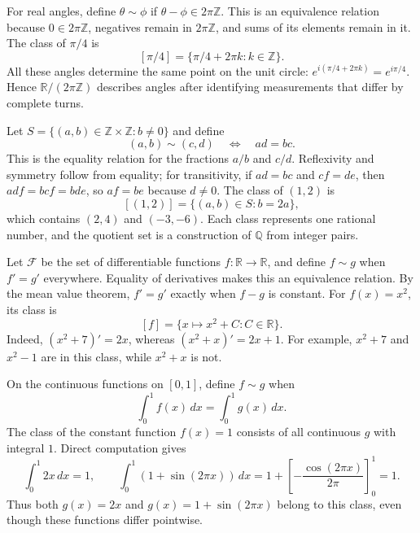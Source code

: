 \begin{example}
For real angles, define $\theta\sim\phi$ if $\theta-\phi\in2\pi\mathbb{Z}$. This is an equivalence relation because $0\in2\pi\mathbb{Z}$, negatives remain in $2\pi\mathbb{Z}$, and sums of its elements remain in it. The class of $\pi/4$ is
\[
  [\pi/4]=\{\pi/4+2\pi k:k\in\mathbb{Z}\}.
\]
All these angles determine the same point on the unit circle: $e^{i(\pi/4+2\pi k)}=e^{i\pi/4}$. Hence $\mathbb{R}/(2\pi\mathbb{Z})$ describes angles after identifying measurements that differ by complete turns.
\end{example}

\begin{example}
Let $S=\{(a,b)\in\mathbb{Z}\times\mathbb{Z}:b\ne0\}$ and define
\[
  (a,b)\sim(c,d)\quad\Longleftrightarrow\quad ad=bc.
\]
This is the equality relation for the fractions $a/b$ and $c/d$. Reflexivity and symmetry follow from equality; for transitivity, if $ad=bc$ and $cf=de$, then $adf=bcf=bde$, so $af=be$ because $d\ne0$. The class of $(1,2)$ is
\[
  [(1,2)]=\{(a,b)\in S:b=2a\},
\]
which contains $(2,4)$ and $(-3,-6)$. Each class represents one rational number, and the quotient set is a construction of $\mathbb{Q}$ from integer pairs.
\end{example}

\begin{example}
Let $\mathcal{F}$ be the set of differentiable functions $f:\mathbb{R}\to\mathbb{R}$, and define $f\sim g$ when $f'=g'$ everywhere. Equality of derivatives makes this an equivalence relation. By the mean value theorem, $f'=g'$ exactly when $f-g$ is constant. For $f(x)=x^2$, its class is
\[
  [f]=\{x\mapsto x^2+C:C\in\mathbb{R}\}.
\]
Indeed, $(x^2+7)'=2x$, whereas $(x^2+x)'=2x+1$.
For example, $x^2+7$ and $x^2-1$ are in this class, while $x^2+x$ is not.
\end{example}

\begin{example}
On the continuous functions on $[0,1]$, define $f\sim g$ when
\[
  \int_0^1 f(x)\,dx=\int_0^1 g(x)\,dx.
\]
The class of the constant function $f(x)=1$ consists of all continuous $g$ with integral $1$. Direct computation gives
\[
  \int_0^1 2x\,dx=1,\qquad
  \int_0^1(1+\sin(2\pi x))\,dx
  =1+\left[-\frac{\cos(2\pi x)}{2\pi}\right]_0^1=1.
\]
Thus both $g(x)=2x$ and $g(x)=1+\sin(2\pi x)$ belong to this class, even though these functions differ pointwise.
\end{example}